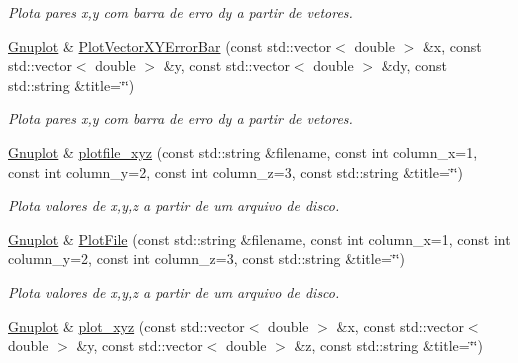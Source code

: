\begin{DoxyCompactItemize}
\begin{DoxyCompactList}\small\item\em Plota pares x,y com barra de erro dy a partir de vetores. \end{DoxyCompactList}\item 
\hypertarget{classGnuplot_a6d3863c1b14d93c14b50df0a11dfdbd8}{\hyperlink{classGnuplot}{Gnuplot} \& \hyperlink{classGnuplot_a6d3863c1b14d93c14b50df0a11dfdbd8}{Plot\-Vector\-X\-Y\-Error\-Bar} (const std\-::vector$<$ double $>$ \&x, const std\-::vector$<$ double $>$ \&y, const std\-::vector$<$ double $>$ \&dy, const std\-::string \&title=\char`\"{}\char`\"{})}\label{classGnuplot_a6d3863c1b14d93c14b50df0a11dfdbd8}

\begin{DoxyCompactList}\small\item\em Plota pares x,y com barra de erro dy a partir de vetores. \end{DoxyCompactList}\item 
\hypertarget{classGnuplot_abd1c17c49fc59979a1143384c77c5b66}{\hyperlink{classGnuplot}{Gnuplot} \& \hyperlink{classGnuplot_abd1c17c49fc59979a1143384c77c5b66}{plotfile\-\_\-xyz} (const std\-::string \&filename, const int column\-\_\-x=1, const int column\-\_\-y=2, const int column\-\_\-z=3, const std\-::string \&title=\char`\"{}\char`\"{})}\label{classGnuplot_abd1c17c49fc59979a1143384c77c5b66}

\begin{DoxyCompactList}\small\item\em Plota valores de x,y,z a partir de um arquivo de disco. \end{DoxyCompactList}\item 
\hypertarget{classGnuplot_a3f5f7127182ea22da3ee0b78f0ade35c}{\hyperlink{classGnuplot}{Gnuplot} \& \hyperlink{classGnuplot_a3f5f7127182ea22da3ee0b78f0ade35c}{Plot\-File} (const std\-::string \&filename, const int column\-\_\-x=1, const int column\-\_\-y=2, const int column\-\_\-z=3, const std\-::string \&title=\char`\"{}\char`\"{})}\label{classGnuplot_a3f5f7127182ea22da3ee0b78f0ade35c}

\begin{DoxyCompactList}\small\item\em Plota valores de x,y,z a partir de um arquivo de disco. \end{DoxyCompactList}\item 
\hypertarget{classGnuplot_aee30f21a00a4f31c8356a2ef1f0e26e3}{\hyperlink{classGnuplot}{Gnuplot} \& \hyperlink{classGnuplot_aee30f21a00a4f31c8356a2ef1f0e26e3}{plot\-\_\-xyz} (const std\-::vector$<$ double $>$ \&x, const std\-::vector$<$ double $>$ \&y, const std\-::vector$<$ double $>$ \&z, const std\-::string \&title=\char`\"{}\char`\"{})}\label{classGnuplot_aee30f21a00a4f31c8356a2ef1f0e26e3}


\end{DoxyCompactItemize}
